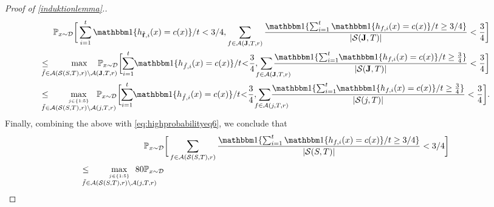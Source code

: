 \begin{proof}[Proof of \cref{induktionlemma}.]
    \begin{align*}
      \p_{x\sim \cD}
      \bigg[
    \sum_{i=1}^{t} \ind\{h_{\rf,i}(x)=c(x)\}/t< 3/4,
    \sum_{f\in \cA(\rJ,T,r)} \frac{\ind\{\sum_{i=1}^{t} \ind\{h_{f,i}(x)=c(x)\}/t\geq 3/4\}}{|\cS(\rJ,T)|}
    <\frac{3}{4}\bigg]
    \\
    \leq   \negmedspace \negmedspace  \negmedspace   \negmedspace \negmedspace \max_{\stackrel{}{\tilde{f}\in \cA(\cS(S,T),r) \backslash \cA(\rJ,T,r)}} \negmedspace \negmedspace  \negmedspace \negmedspace \negmedspace \negmedspace \negmedspace  \negmedspace \negmedspace \negmedspace\negmedspace \p_{x\sim \cD}
    \bigg[
      \negmedspace \sum_{i=1}^{t}\negmedspace  \ind\{h_{\tilde{f},i}(x)=c(x)\}/t\negmedspace <\negmedspace \frac{3}{4},
  \negmedspace \negmedspace  \negmedspace  \negmedspace \negmedspace  \negmedspace \negmedspace \negmedspace \negmedspace\sum_{\text{\quad\quad}f\in \cA(\rJ,T,r)} \negmedspace \negmedspace \negmedspace \negmedspace\negmedspace \negmedspace  \negmedspace \negmedspace \negmedspace \negmedspace \frac{\ind\{\sum_{i=1}^{t}\negmedspace  \ind\{h_{f,i}(x)=c(x)\}/t\geq \frac{3}{4}\}}{|\cS(\rJ,T)|}
  <\frac{3}{4}\bigg]
    \\
    \leq   \negmedspace \negmedspace  \negmedspace   \negmedspace \negmedspace \max_{\stackrel{j\in\{ 1:5 \}}{\tilde{f}\in \cA(\cS(S,T),r) \backslash \cA(j,T,r)}} \negmedspace \negmedspace  \negmedspace \negmedspace \negmedspace \negmedspace \negmedspace  \negmedspace \negmedspace \negmedspace\negmedspace \p_{x\sim \cD}
    \bigg[
      \negmedspace \sum_{i=1}^{t}\negmedspace  \ind\{h_{\tilde{f},i}(x)=c(x)\}/t\negmedspace <\negmedspace \frac{3}{4},
  \negmedspace \negmedspace  \negmedspace  \negmedspace \negmedspace  \negmedspace \negmedspace \negmedspace \negmedspace\sum_{\text{\quad\quad}f\in \cA(j,T,r)} \negmedspace \negmedspace \negmedspace \negmedspace\negmedspace \negmedspace  \negmedspace \negmedspace \negmedspace \negmedspace \frac{\ind\{\sum_{i=1}^{t}\negmedspace  \ind\{h_{f,i}(x)=c(x)\}/t\geq \frac{3}{4}\}}{|\cS(j,T)|}
  <\frac{3}{4}\bigg].
    \end{align*}
Finally, combining the above with \cref{eq:highprobabilityeq6}, we conclude that
    \begin{align*}
        &\p_{x\sim \cD} \bigg[  
          \sum_{f\in \cA(\cS(S,T),r)} \frac{\ind\{\sum_{i=1}^{t} \ind\{h_{f,i}(x)=c(x)\}/t\geq 3/4\}}{|\cS(S,T)|}
           <3/4\bigg]
        \\
        \leq \negmedspace \negmedspace  \negmedspace   \negmedspace \negmedspace \max_{\stackrel{j\in\{ 1:5 \}}{\tilde{f}\in \cA(\cS(S,T),r) \backslash \cA(j,T,r)}} \negmedspace \negmedspace  \negmedspace \negmedspace \negmedspace \negmedspace \negmedspace  \negmedspace \negmedspace \negmedspace\negmedspace \negmedspace80&\p_{x\sim \cD}

\end{align*}
\end{proof}
